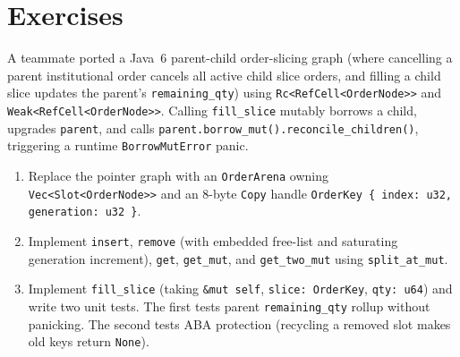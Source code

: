 \section{Exercises}
\label{ch08:exercises}

\begin{exercise}
A teammate ported a Java~6 parent-child order-slicing graph (where cancelling a parent institutional order cancels all active child slice orders, and filling a child slice updates the parent's \texttt{remaining\_qty}) using \texttt{Rc<RefCell<OrderNode>>} and \texttt{Weak<RefCell<OrderNode>>}. Calling \texttt{fill\_slice} mutably borrows a child, upgrades \texttt{parent}, and calls \texttt{parent.\allowbreak{}borrow\_mut().\allowbreak{}reconcile\_children()}, triggering a runtime \texttt{BorrowMutError} panic.
\begin{enumerate}[label=(\alph*)]
  \item Replace the pointer graph with an \texttt{OrderArena} owning \texttt{Vec<Slot<OrderNode>>} and an 8-byte \texttt{Copy} handle \texttt{OrderKey \{ index: u32, generation: u32 \}}.
  \item Implement \texttt{insert}, \texttt{remove} (with embedded free-list and saturating generation increment), \texttt{get}, \texttt{get\_mut}, and \texttt{get\_two\_mut} using \texttt{split\_at\_mut}.
  \item Implement \texttt{fill\_slice} (taking \texttt{\&mut self}, \texttt{slice: OrderKey}, \texttt{qty: u64}) and write two unit tests. The first tests parent \texttt{remaining\_qty} rollup without panicking. The second tests ABA protection (recycling a removed slot makes old keys return \texttt{None}).
\end{enumerate}
\end{exercise}


